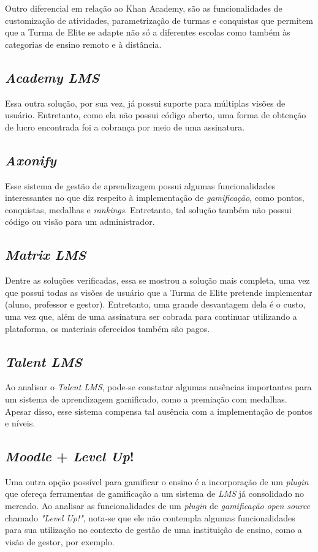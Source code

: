 \documentclass[
    12pt,               %
    openright,          %
    oneside,
    a4paper,            %
    paginasA3,  %
    MODELO,             %
    TODO,               %
    english,            %
    brazil              %
    ]{ifsp-spo-inf-ctds} %
\begin{document}
Outro diferencial em relação ao Khan Academy, são as funcionalidades de customização de atividades, parametrização de turmas e conquistas que permitem que a Turma de Elite se adapte não só a diferentes escolas como também às categorias de ensino remoto e à distância.

\subsection{\textit{Academy LMS}}
Essa outra solução, por sua vez, já possui suporte para múltiplas visões de usuário.
Entretanto, como ela não possui código aberto, uma forma de obtenção de lucro encontrada foi a cobrança por meio de uma assinatura.

\subsection{\textit{Axonify}}
Esse sistema de gestão de aprendizagem possui algumas funcionalidades interessantes no que diz respeito à implementação de \textit{gamificação}, como pontos, conquistas, medalhas e \textit{rankings}. Entretanto, tal solução também não possui código ou visão para um administrador. 

\subsection{\textit{Matrix LMS}}
Dentre as soluções verificadas, essa se mostrou a solução mais completa, uma vez que possui todas as visões de usuário que a Turma de Elite pretende implementar (aluno, professor e gestor). Entretanto, uma grande desvantagem dela é o custo, uma vez que, além de uma assinatura ser cobrada para continuar utilizando a plataforma, os materiais oferecidos também são pagos.  

\subsection{\textit{Talent LMS}}
Ao analisar o \textit{Talent LMS}, pode-se constatar algumas ausências importantes para um sistema de aprendizagem gamificado, como a premiação com medalhas. Apesar disso, esse sistema compensa tal ausência com a implementação de pontos e níveis.

\subsection{\textit{Moodle} + \textit{Level Up}!}
Uma outra opção possível para gamificar o ensino é a incorporação de um \textit{plugin} que ofereça ferramentas de gamificação a um sistema de \textit{LMS} já consolidado no mercado. Ao analisar as funcionalidades de um \textit{plugin} de \textit{gamificação} \textit{open source} chamado \textit{"Level Up!"}, nota-se que ele não contempla algumas funcionalidades para sua utilização no contexto de gestão de uma instituição de ensino, como a visão de gestor, por exemplo.
\end{document}
